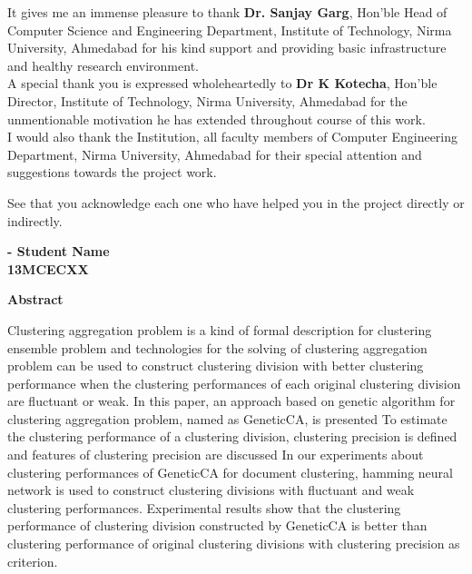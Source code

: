 It gives me an immense pleasure to thank \textbf{Dr. Sanjay Garg}, Hon'ble Head of Computer Science and Engineering Department, Institute of Technology, Nirma University, Ahmedabad for his kind support and providing basic infrastructure and healthy research environment.\\

A special thank you is expressed wholeheartedly to \textbf{Dr K Kotecha}, Hon'ble Director, Institute of Technology, Nirma University, Ahmedabad for the unmentionable motivation he has extended throughout course of this work.\\

I would also thank the Institution, all faculty members of Computer Engineering Department, Nirma University, Ahmedabad for their special attention and suggestions towards the project work.

See that you acknowledge each one who have helped you in the project directly or indirectly.
\\



\begin{flushright}
\textbf{- Student Name}\\ \textbf{13MCECXX}
\end{flushright}

\newpage
{}
\begin{center}
{\Large \bf Abstract}\\
\end{center}
\vspace{10pt}

Clustering aggregation problem is a kind of formal description for clustering ensemble problem and technologies for the solving of clustering aggregation problem can be used to construct clustering division with better clustering performance when the clustering performances of each original clustering division are fluctuant or weak. In this paper, an approach based on genetic algorithm for clustering aggregation problem, named as GeneticCA, is presented To estimate the clustering performance of a clustering division, clustering precision is defined and features of clustering precision are discussed In our experiments about clustering performances of GeneticCA for document clustering, hamming neural network is used to construct clustering divisions with fluctuant and weak clustering performances. Experimental results show that the clustering performance of clustering division constructed by GeneticCA is better than clustering performance of original clustering divisions with clustering precision as criterion.\\




